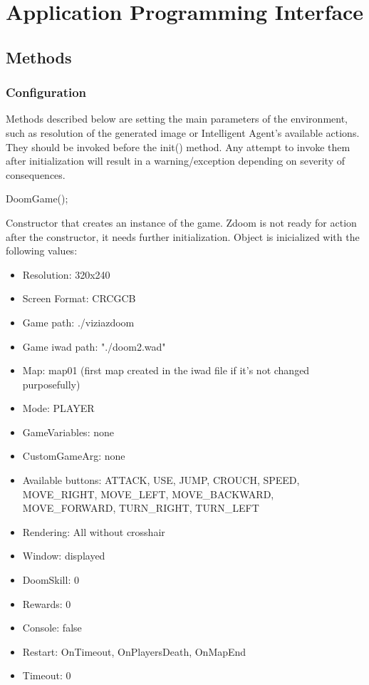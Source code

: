 \chapter{Application Programming Interface}\label{ch:api}
\section{Methods}\label{sec:methods}
	\subsection{Configuration}\label{subsec:config_methods}
	Methods described below are setting the main parameters of the environment, such as resolution of the generated image or Intelligent Agent's available actions. They should be invoked before the init() method. Any attempt to invoke them after initialization will result in a warning/exception depending on severity of consequences. 
	\vspace{20pt}

\begin{clinee}
DoomGame();
\end{clinee}

Constructor that creates an instance of the game. Zdoom is not ready for action after the constructor, it needs further initialization. Object is inicialized with the following values:
	\begin{itemize}
\item Resolution: 320x240
\item Screen Format: CRCGCB
\item Game path: ./viziazdoom
\item Game iwad path: "./doom2.wad"
\item Map: map01 (first map created in the iwad file if it's not changed purposefully)
\item Mode: PLAYER
\item GameVariables: none
\item CustomGameArg: none
\item Available buttons: ATTACK, USE, JUMP, CROUCH, SPEED, MOVE\_RIGHT, MOVE\_LEFT, MOVE\_BACKWARD, MOVE\_FORWARD, TURN\_RIGHT, TURN\_LEFT
\item Rendering: All without crosshair
\item Window: displayed 
\item DoomSkill: 0
\item Rewards: 0
\item Console: false
\item Restart: OnTimeout, OnPlayersDeath, OnMapEnd
\item Timeout: 0
	\end{itemize}


